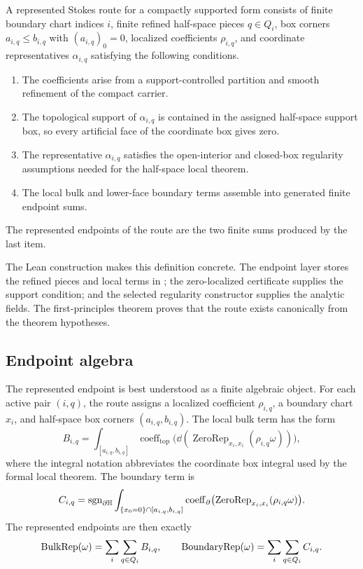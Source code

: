 \begin{definition}
A represented Stokes route for a compactly supported form consists of finite
boundary chart indices \(i\), finite refined half-space pieces \(q\in Q_i\),
box corners \(a_{i,q}\le b_{i,q}\) with \((a_{i,q})_0=0\), localized
coefficients \(\rho_{i,q}\), and coordinate representatives
\(\alpha_{i,q}\) satisfying the following conditions.
\begin{enumerate}
  \item The coefficients arise from a support-controlled partition and smooth
  refinement of the compact carrier.
  \item The topological support of \(\alpha_{i,q}\) is contained in the
  assigned half-space support box, so every artificial face of the coordinate
  box gives zero.
  \item The representative \(\alpha_{i,q}\) satisfies the open-interior and
  closed-box regularity assumptions needed for the half-space local theorem.
  \item The local bulk and lower-face boundary terms assemble into generated
  finite endpoint sums.
\end{enumerate}
The represented endpoints of the route are the two finite sums produced by the
last item.
\end{definition}

The Lean construction makes this definition concrete.  The endpoint layer
stores the refined pieces and local terms in
; the zero-localized
certificate supplies the support condition; and the selected regularity
constructor supplies the analytic fields.  The first-principles theorem proves
that the route exists canonically from the theorem hypotheses.

\subsection{Endpoint algebra}

The represented endpoint is best understood as a finite algebraic object.  For
each active pair \((i,q)\), the route assigns a localized coefficient
\(\rho_{i,q}\), a boundary chart \(x_i\), and half-space box corners
\((a_{i,q},b_{i,q})\).  The local bulk term has the form
\[
  B_{i,q}
  =
  \int_{[a_{i,q},b_{i,q}]}
    \operatorname{coeff}_{\mathrm{top}}
      \bigl(\dd(\operatorname{ZeroRep}_{x_i,x_i}(\rho_{i,q}\omega))\bigr),
\]
where the integral notation abbreviates the coordinate box integral used by
the formal local theorem.  The boundary term is
\[
  C_{i,q}
  =
  \operatorname{sgn}_{\partial\mathbb{H}}
  \int_{\{x_0=0\}\cap [a_{i,q},b_{i,q}]}
    \operatorname{coeff}_{\partial}
      \bigl(\operatorname{ZeroRep}_{x_i,x_i}(\rho_{i,q}\omega)\bigr).
\]
The represented endpoints are then exactly
\[
  \operatorname{BulkRep}(\omega)=\sum_i\sum_{q\in Q_i} B_{i,q},
  \qquad
  \operatorname{BoundaryRep}(\omega)=\sum_i\sum_{q\in Q_i} C_{i,q}.
\]

